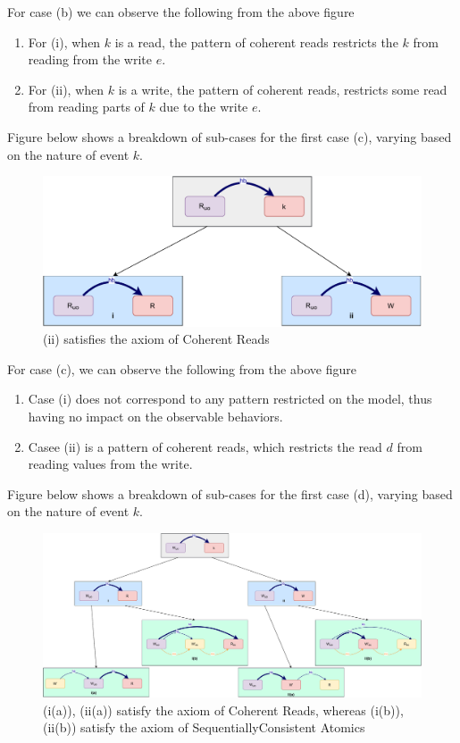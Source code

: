     For case (b) we can observe the following from the above figure 
    \begin{enumerate}
        \item For (i), when $k$ is a read, the pattern of coherent reads restricts the $k$ from reading from the write $e$. 
        \item For (ii), when $k$ is a write, the pattern of coherent reads, restricts some read from reading parts of $k$ due to the write $e$.   
    \end{enumerate}

    Figure below shows a breakdown of sub-cases for the first case (c), varying based
    on the nature of event $k$.
    \begin{figure}[H]
        \centering
        \includegraphics[scale=0.6]{InstructionReordering/ValidReorderingProof/ProofParts/Part4/part4(c).pdf}
        \caption{(ii) satisfies the axiom of Coherent Reads}
        \label{fig:my_label}
    \end{figure}
    
    For case (c), we can observe the following from the above figure
    \begin{enumerate}
        \item Case (i) does not correspond to any pattern restricted on the model, thus having no impact on the observable behaviors. 
        \item Casee (ii) is a pattern of coherent reads, which restricts the read $d$ from reading values from the write. 
    \end{enumerate}

    Figure below shows a breakdown of sub-cases for the first case (d), varying based
    on the nature of event $k$.
    \begin{figure}[H]
        \centering
        \includegraphics[scale=0.4]{InstructionReordering/ValidReorderingProof/ProofParts/Part4/part4(d).pdf}
        \caption{(i(a)), (ii(a)) satisfy the axiom of Coherent Reads, whereas (i(b)), (ii(b)) satisfy the axiom of SequentiallyConsistent Atomics}
        \label{fig:my_label}
    \end{figure}


